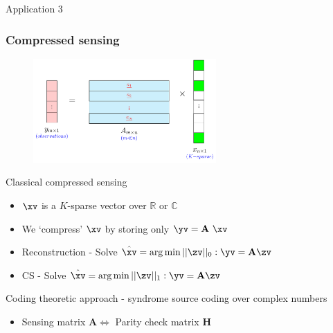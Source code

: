 \begin{frame}{Application 3}
\end{frame}
\begin{frame} \frametitle{Compressed sensing}
\vspace*{-0.2in}
\begin{figure}[t]
\centering
\includegraphics[width=2.75in]{./Figures/A_times_X_CS.pdf}
\end{figure}
\vspace*{-0.2in}
\begin{block}{Classical compressed sensing}
\begin{itemize}
\item $\xv$ is a $K$-sparse vector over $\mathbb{R}$ or $\mathbb{C}$
\item We `compress' $\xv$ by storing only $\yv = \mathbf{A} \ \xv$
\item Reconstruction - Solve $\hat{\xv} = \arg \min ||\zv||_0 : \yv = \mathbf{A} \zv$
\item CS - Solve $\hat{\xv} = \arg \min ||\zv||_1 : \yv = \mathbf{A} \zv$
\end{itemize}
\end{block}
\pause
\begin{block}{Coding theoretic approach - syndrome source coding over complex numbers}
\begin{itemize}

\item Sensing matrix $\mathbf{A} \Leftrightarrow $ Parity check matrix $\mathbf{H}$
\end{itemize}
\end{block}
\end{frame}		
